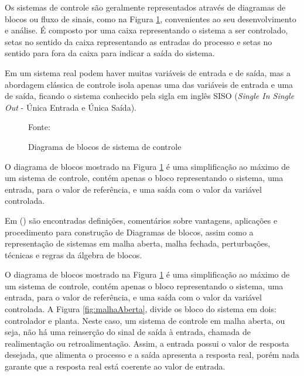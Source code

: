 Os sistemas de controle são geralmente representados através de diagramas de blocos ou fluxo de sinais, como na Figura \ref{fig:processo}, convenientes ao seu desenvolvimento e análise. 
É composto por uma caixa representando o sistema a ser controlado, setas no sentido da caixa representando as entradas do processo e setas no sentido para fora da caixa para indicar a saída do sistema.


Em um sistema real podem haver muitas variáveis de entrada e de saída, mas a abordagem clássica de controle isola apenas uma das variáveis de entrada e uma de saída, ficando o sistema conhecido pela sigla em inglês SISO (\emph{Single In Single Out} - Única Entrada e Única Saída).


\begin{figure}[!htb]
\centering
\caption{ Diagrama de blocos de sistema de controle}
\label{fig:processo}

{\small Fonte: \cite{Ogata} }
\end{figure}


O diagrama de blocos mostrado na Figura \ref{fig:processo} é uma simplificação ao máximo de um sistema de controle, contém apenas o bloco representando o sistema, uma entrada, para o valor de referência, e uma saída com o valor da variável controlada.


Em \citeauthor{Ogata}(\citeyear{Ogata}) %
são encontradas definições, comentários sobre vantagens, aplicações e procedimento para construção de Diagramas de blocos, assim como a representação de sistemas em malha aberta, malha fechada, perturbações, técnicas e regras da álgebra de blocos.


O diagrama de blocos mostrado na Figura \ref{fig:processo} é uma simplificação ao máximo de um sistema de controle, contém apenas o bloco representando o sistema, uma entrada, para o valor de referência, e uma saída com o valor da variável controlada. A Figura \ref{fig:malhaAberta}, divide os bloco do sistema em dois: controlador e planta. Neste caso, um sistema de controle em malha aberta, ou seja, não há uma reinserção do sinal de saída à entrada, chamada de realimentação ou retroalimentação. Assim, a entrada possui o valor de resposta desejada, que alimenta o processo e a saída apresenta a resposta real, porém nada garante que a resposta real está coerente ao valor de entrada.

